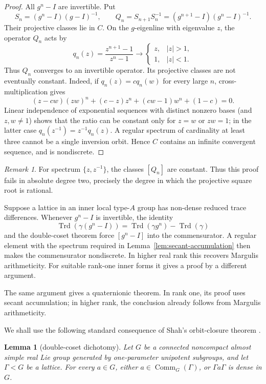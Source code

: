 \documentclass[11pt,reqno]{amsart}
\newtheorem{lemma}[theorem]{Lemma}
\theoremstyle{definition}
\theoremstyle{remark}
\newtheorem{remark}[theorem]{Remark}
\newcommand{\Trd}{\operatorname{Trd}}
\newcommand{\Comm}{\operatorname{Comm}}
\begin{document}
\begin{proof}
All \(g^n-I\) are invertible.  Put
\[
 S_n=(g^n-I)(g-I)^{-1},\qquad
 Q_n=S_{n+1}S_n^{-1}=(g^{n+1}-I)(g^n-I)^{-1}.
\]
Their projective classes lie in \(C\).  On the \(g\)-eigenline with
eigenvalue \(z\), the operator \(Q_n\) acts by
\[
 q_n(z)=\frac{z^{n+1}-1}{z^n-1}\longrightarrow
 \begin{cases}
 z,&|z|>1,\\
 1,&|z|<1.
 \end{cases}
\tag{7.1}
\]
Thus \(Q_n\) converges to an invertible operator.  Its projective classes are
not eventually constant.  Indeed, if \(q_n(z)=c q_n(w)\) for every large
\(n\), cross-multiplication gives
\[
 (z-cw)(zw)^n+(c-z)z^n+(cw-1)w^n+(1-c)=0.
\]
Linear independence of exponential sequences with distinct nonzero bases
(and \(z,w\ne1\)) shows that the ratio can be constant only for \(z=w\) or
\(zw=1\); in the latter case
\(q_n(z^{-1})=z^{-1}q_n(z)\).  A regular spectrum of cardinality at least three
cannot be a single inversion orbit.  Hence \(C\) contains an infinite
convergent sequence, and is nondiscrete.
\end{proof}

\begin{remark}
For spectrum \(\{z,z^{-1}\}\), the classes \([Q_n]\) are constant.  Thus
this proof fails in absolute degree two, precisely the degree in which the
projective square root is rational.
\end{remark}

Suppose a lattice in an inner local type-\(A\) group has non-dense reduced
trace differences.  Whenever \(g^n-I\) is invertible, the identity
\[
 \Trd(\gamma(g^n-I))=\Trd(\gamma g^n)-\Trd(\gamma)
\]
and the double-coset theorem force \([g^n-I]\) into the commensurator.  A
regular element with the spectrum required in
Lemma~\ref{lem:secant-accumulation} then makes the commensurator nondiscrete.
In higher real rank this recovers Margulis arithmeticity.  For suitable
rank-one inner forms it gives a proof by a different argument.

The same argument gives a quaternionic theorem. In rank one, its proof uses
secant accumulation; in higher rank, the conclusion already follows from
Margulis arithmeticity.

We shall use the following standard consequence of Shah's orbit-closure
theorem \cite{Shah}.

\begin{lemma}[double-coset dichotomy]\label{lem:double-coset}
Let \(G\) be a connected noncompact almost simple real Lie group generated by
one-parameter unipotent subgroups, and let \(\Gamma<G\) be a lattice.  For every
\(a\in G\), either \(a\in\Comm_G(\Gamma)\), or \(\Gamma a\Gamma\) is dense in
\(G\).
\end{lemma}
\end{document}
